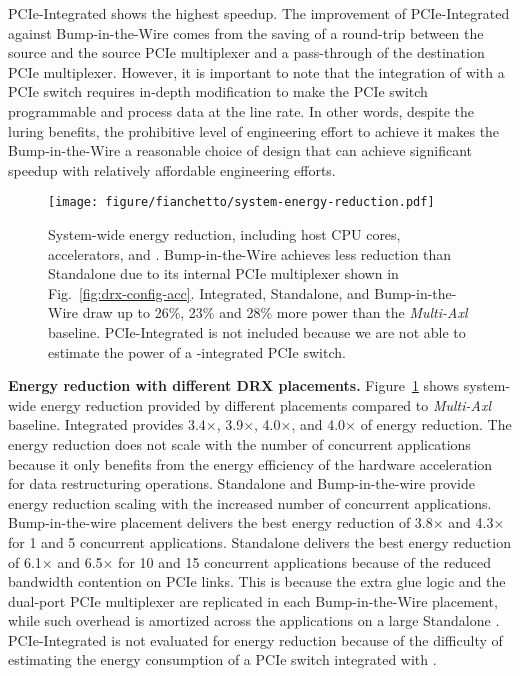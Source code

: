 %
PCIe-Integrated \drx shows the highest speedup.
%
The improvement of PCIe-Integrated \drx against Bump-in-the-Wire \drx comes from the saving of a round-trip between the source \drx and the source PCIe multiplexer and a pass-through of the destination PCIe multiplexer.
%
However, it is important to note that the integration of \drx with a PCIe switch requires in-depth modification to make the PCIe switch programmable and process data at the line rate. 
%
In other words, despite the luring benefits, the prohibitive level of engineering effort to achieve it makes the Bump-in-the-Wire a reasonable choice of \dmx design that can achieve significant speedup with relatively affordable engineering efforts.

\begin{figure}[t!]
    \centering
    \texttt{[image: figure/fianchetto/system-energy-reduction.pdf]}
    \caption{System-wide energy reduction, including host CPU cores, accelerators, and \drxs. 
    Bump-in-the-Wire \drx achieves less reduction than Standalone \drx due to its internal PCIe multiplexer shown in Fig.~\ref{fig:drx-config-acc}.
    Integrated, Standalone, and Bump-in-the-Wire \drx draw up to 26\%, 23\% and 28\% more power than the \emph{Multi-Axl} baseline. 
    PCIe-Integrated is not included because we are not able to estimate the power of a \drx-integrated PCIe switch.
    }
    \label{fig:res:energy-drx-placement} 
\end{figure}

\noindent \textbf{Energy reduction with different DRX placements.}
%
Figure~\ref{fig:res:energy-drx-placement} shows system-wide energy reduction provided by different \drx placements compared to \emph{Multi-Axl} baseline.
%
Integrated \drx provides 3.4$\times$, 3.9$\times$, 4.0$\times$, and 4.0$\times$ of energy reduction. 
%
The energy reduction does not scale with the number of concurrent applications because it only benefits from the energy efficiency of the \drx hardware acceleration for data restructuring operations. 
%
Standalone \drx and Bump-in-the-wire \drx provide energy reduction scaling with the increased number of concurrent applications.
%
Bump-in-the-wire \drx placement delivers the best energy reduction of 3.8$\times$ and 4.3$\times$ for 1 and 5 concurrent applications. 
%
Standalone \drx delivers the best energy reduction of 6.1$\times$ and 6.5$\times$ for 10 and 15 concurrent applications because of the reduced bandwidth contention on PCIe links.
%
This is because the extra glue logic and the dual-port PCIe multiplexer are replicated in each Bump-in-the-Wire \drx placement, while such overhead is amortized across the applications on a large Standalone \drx. 
%
PCIe-Integrated is not evaluated for energy reduction because of the difficulty of estimating the energy consumption of a PCIe switch integrated with \drx.
%
